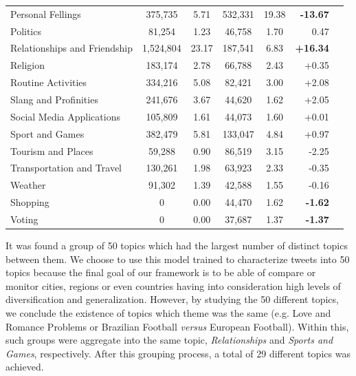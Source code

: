 \begin{table}[!hb]
{\begin{tabular}{l|S[table-format=7.0]S[table-format=2.2]|S[table-format=7.0]S[table-format=2.2]|rS[table-format=2.2]}
			Personal Fellings & 375,735 & 5.71 & 532,331 & 19.38 & \textbf{-13.67} \\
			Politics & 81,254 & 1.23 & 46,758 & 1.70 & 0.47 \\
			Relationships and Friendship & 1,524,804 & 23.17 & 187,541 & 6.83 & \textbf{+16.34} \\
			Religion & 183,174 & 2.78 & 66,788 & 2.43 & +0.35 \\
			Routine Activities & 334,216 & 5.08 & 82,421 & 3.00 & +2.08 \\
			Slang and Profinities & 241,676 & 3.67 & 44,620 & 1.62 & +2.05 \\
			Social Media Applications & 105,809 & 1.61 & 44,073 & 1.60 & +0.01 \\
			Sport and Games & 382,479 & 5.81 & 133,047 & 4.84 & +0.97 \\
			Tourism and Places & 59,288 & 0.90 & 86,519 & 3.15 & -2.25 \\
			Transportation and Travel & 130,261 & 1.98 & 63,923 & 2.33 & -0.35 \\
			Weather & 91,302 & 1.39 & 42,588 & 1.55 & -0.16 \\
			Shopping & 0 & 0.00 & 44,470 & 1.62 & \textbf{-1.62} \\
			Voting & 0 & 0.00 & 37,687 & 1.37 & \textbf{-1.37} \\ \hline
		\end{tabular}
	}
\end{table}

It was found a group of 50 topics which had the largest number of distinct topics between them. We choose to use this model trained to characterize tweets into 50 topics because the final goal of our framework is to be able of compare or monitor cities, regions or even countries having into consideration high levels of diversification and generalization. However, by studying the 50 different topics, we conclude the existence of topics which theme was the same (e.g. Love and Romance Problems or Brazilian Football \textit{versus} European Football). Within this, such groups were aggregate into the same topic, \textit{Relationships} and \textit{Sports and Games}, respectively. After this grouping process, a total of 29 different topics was achieved. 

